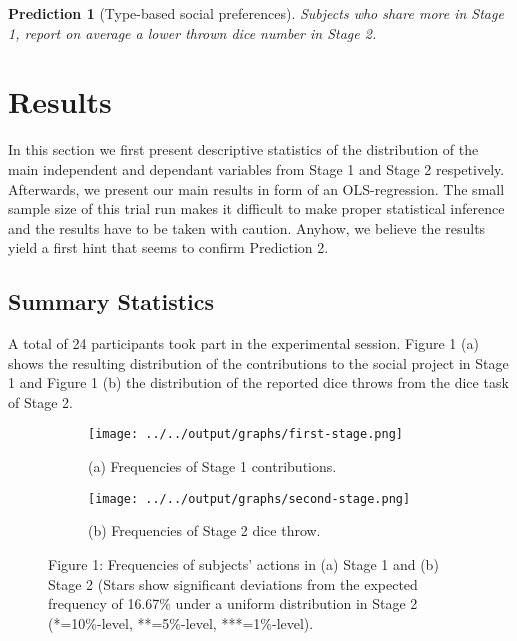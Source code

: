 \documentclass[12pt, a4paper]{article}
\newtheorem{prediction}{Prediction}
\begin{document}
\begin{prediction}[Type-based social preferences]
Subjects who share more in Stage 1, report on average a lower thrown dice number in Stage 2.
\end{prediction}

\section{Results}
In this section we first present descriptive statistics of the distribution of the main independent and dependant variables from Stage 1 and Stage 2 respetively. Afterwards, we present our main results in form of an OLS-regression. The small sample size of this trial run makes it difficult to make proper statistical inference and the results have to be taken with caution. Anyhow, we believe the results yield a first hint that seems to confirm Prediction 2.

\subsection{Summary Statistics}

A total of 24 participants took part in the experimental session. Figure 1 (a) shows the resulting distribution of the contributions to the social project in Stage 1 and Figure 1 (b) the distribution of the reported dice throws from the dice task of Stage 2.

\begin{figure}[!h]
\centering
\begin{subfigure}{.5\textwidth}
  \centering
  \texttt{[image: ../../output/graphs/first-stage.png]}
  \caption*{\footnotesize (a) Frequencies of Stage 1 contributions.}
  \label{fig:sub1}
\end{subfigure}%
\begin{subfigure}{.5\textwidth}
  \centering
  \texttt{[image: ../../output/graphs/second-stage.png]}
  \caption*{\footnotesize (b) Frequencies of Stage 2 dice throw.}
  \label{fig:sub2}
\end{subfigure}
\caption*{\footnotesize Figure 1: Frequencies of subjects' actions in (a) Stage 1 and (b) Stage 2 (Stars show significant deviations from the expected frequency of 16.67\% under a uniform distribution in Stage 2 (*=10\%-level, **=5\%-level, ***=1\%-level).}
\end{figure}
\end{document}
